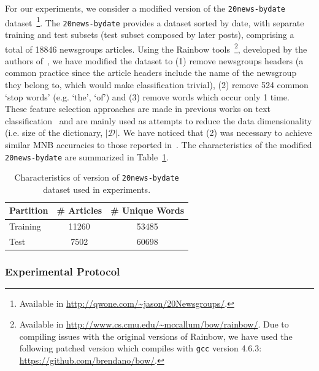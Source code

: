 For our 
experiments, we consider a modified version of the \verb+20news-bydate+ 
dataset~\footnote{Available in \url{http://qwone.com/~jason/20Newsgroups/}.}. 
The \verb+20news-bydate+ provides a dataset 
sorted by date, with separate training and test subsets (test subset composed by later posts), comprising a total of 
18846 newsgroups articles. 
Using the Rainbow tools~\cprotect\footnote{Available in \url{http://www.cs.cmu.edu/~mccallum/bow/rainbow/}. Due to compiling issues with the original versions 
of Rainbow, we have used the following patched version which compiles 
with \verb+gcc+ version 4.6.3: \url{https://github.com/brendano/bow/}.}, developed by the authors of~\cite{McCallum98acomparison,Nigam2000}, we have 
modified the dataset to (1) remove newsgroups headers (a common practice since 
the article headers include the name of the newsgroup they belong to, which 
would make classification trivial), (2) remove 524 common `stop words' (e.g. 
`the', `of') and (3) remove words which occur only 1 time. These feature 
selection approaches are made 
in previous works on text 
classification~\cite{McCallum98acomparison,Nigam2000,Kibriya:2004:MNB:2146834.2146882,Su2011} and are mainly used as 
attempts to reduce the data dimensionality (i.e. size of the dictionary, 
$|\mathcal{D}|$. We have noticed that (2) was necessary to achieve similar MNB 
accuracies to those reported in~\cite{McCallum98acomparison,Nigam2000}. The characteristics of the modified 
\verb+20news-bydate+ are summarized in Table~\ref{tab:dataset-chars}.

\begin{table}
    \begin{center}
        \begin{tabular}{|l|c|c|}
            \hline
            \textbf{Partition}   & \textbf{\# Articles}   & \textbf{\# Unique Words} \\
            \hline\hline
            Training    & 11260         & 53485 \\
            Test        & 7502          & 60698 \\
            \hline
        \end{tabular}
    \end{center}
    \cprotect\caption{Characteristics of version of \verb+20news-bydate+ dataset used in experiments.}
    \label{tab:dataset-chars}
\end{table}

\subsubsection{Experimental Protocol}
\label{subsubsec:protocol}

